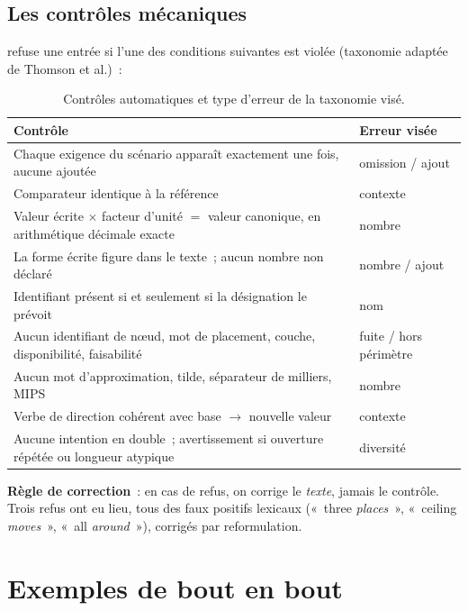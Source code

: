 \documentclass[11pt,a4paper]{article}
\newcommand{\code}[1]{\texttt{\detokenize{#1}}}
\begin{document}
\subsection{Les contrôles mécaniques}

\code{append} refuse une entrée si l'une des conditions suivantes est violée (taxonomie adaptée de Thomson et al.)~:

\begin{table}[h]
\centering
\caption{Contrôles automatiques et type d'erreur de la taxonomie visé.}
\small
\begin{tabularx}{\linewidth}{@{}Xl@{}}
\toprule
Contrôle & Erreur visée \\
\midrule
Chaque exigence du scénario apparaît exactement une fois, aucune ajoutée & omission / ajout \\
Comparateur identique à la référence & contexte \\
Valeur écrite $\times$ facteur d'unité $=$ valeur canonique, en arithmétique décimale exacte & nombre \\
La forme écrite figure dans le texte~; aucun nombre non déclaré & nombre / ajout \\
Identifiant présent si et seulement si la désignation le prévoit & nom \\
Aucun identifiant de nœud, mot de placement, couche, disponibilité, faisabilité & fuite / hors périmètre \\
Aucun mot d'approximation, tilde, séparateur de milliers, MIPS & nombre \\
Verbe de direction cohérent avec base $\to$ nouvelle valeur & contexte \\
Aucune intention en double~; avertissement si ouverture répétée ou longueur atypique & diversité \\
\bottomrule
\end{tabularx}
\end{table}

\textbf{Règle de correction}~: en cas de refus, on corrige le \emph{texte}, jamais le contrôle. Trois refus ont eu lieu, tous des faux positifs lexicaux («~three \emph{places}~», «~ceiling \emph{moves}~», «~all \emph{around}~»), corrigés par reformulation.

\section{Exemples de bout en bout}
\end{document}
